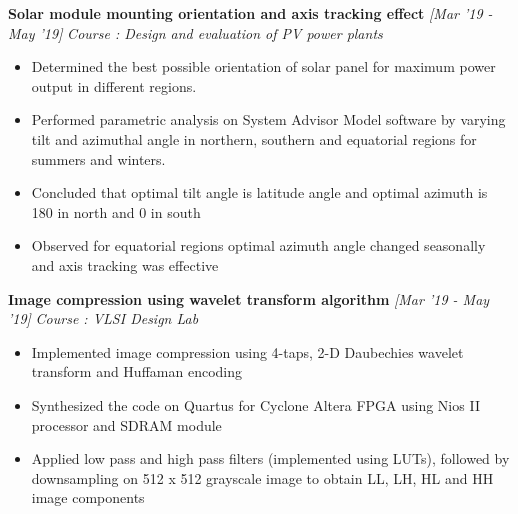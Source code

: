 \documentclass[10 pt]{article}%
\begin{document}
{\begin{itemize}[leftmargin=*]
\end{itemize}
{\flushleft \textbf {\large{Solar module mounting orientation and axis tracking effect}} \hfill {{{\em{[Mar '19 - May '19]}}}}
\vspace{-0.8em}
{\flushleft \em{Course : Design and evaluation of PV power plants}}
\vspace{-5pt}
\begin{itemize}[leftmargin=*]
	\setlength\itemsep{1.5pt}
	\setlength\parskip{1.5pt}
  \item Determined the best possible orientation of solar panel for maximum power output in different regions.
\item Performed parametric analysis on System Advisor Model software by varying tilt and azimuthal angle in northern, southern and equatorial regions for summers and winters.
\item Concluded that optimal tilt angle is latitude angle and optimal azimuth is 180 in north and 0 in south
\item Observed for equatorial regions optimal azimuth angle changed seasonally and axis tracking was effective
\end{itemize}
{\flushleft \textbf {\large{Image compression using wavelet transform algorithm}} \hfill {{{\em{[Mar '19 - May '19]}}}}
	\vspace{-0.8em}
	{\flushleft \em{Course : VLSI Design Lab}}
	\vspace{-5pt}
	\begin{itemize}[leftmargin=*]
		\setlength\itemsep{1.5pt}
		\setlength\parskip{1.5pt}
		\item Implemented image compression using 4-taps, 2-D Daubechies wavelet transform and Huffaman encoding
		\item Synthesized the code on Quartus for Cyclone Altera FPGA using Nios II processor and SDRAM module
	\item Applied low pass and high pass filters (implemented using LUTs), followed by downsampling on 512 x 512 grayscale image to obtain LL, LH, HL and HH image components

\end{itemize}}}}
\end{document}
